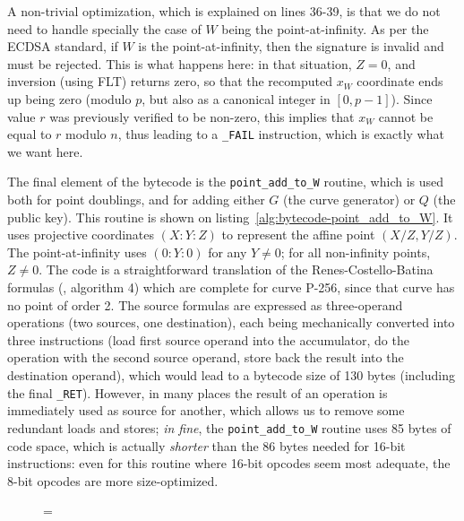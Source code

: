 \documentclass{llncs}
\newenvironment{forbidpagebreak}
    {\par\nobreak\vfil\penalty 0\vfilneg
     \vtop\bgroup}
    {\par\xdef\tpd{\the\prevdepth}\egroup
     \prevdepth=\tpd}
\begin{document}
A non-trivial optimization, which is explained on lines 36-39, is that
we do not need to handle specially the case of $W$ being the
point-at-infinity. As per the ECDSA standard, if $W$ is the
point-at-infinity, then the signature is invalid and must be rejected.
This is what happens here: in that situation, $Z = 0$, and inversion
(using FLT) returns zero, so that the recomputed $x_W$ coordinate ends
up being zero (modulo $p$, but also as a canonical integer in $[0,
p-1]$). Since value $r$ was previously verified to be non-zero, this
implies that $x_W$ cannot be equal to $r$ modulo $n$, thus leading to a
\verb+_FAIL+ instruction, which is exactly what we want here.

The final element of the bytecode is the \verb+point_add_to_W+ routine,
which is used both for point doublings, and for adding either $G$ (the
curve generator) or $Q$ (the public key). This routine is shown on
listing~\ref{alg:bytecode-point_add_to_W}. It uses projective
coordinates $(X{:}Y{:}Z)$ to represent the affine point $(X/Z, Y/Z)$.
The point-at-infinity uses $(0{:}Y{:}0)$ for any $Y\neq 0$; for all
non-infinity points, $Z\neq 0$. The code is a straightforward
translation of the Renes-Costello-Batina formulas (\cite{RenCosBat2016},
algorithm 4) which are complete for curve P-256, since that curve has no
point of order 2. The source formulas are expressed as three-operand
operations (two sources, one destination), each being mechanically
converted into three instructions (load first source operand into the
accumulator, do the operation with the second source operand, store back
the result into the destination operand), which would lead to a bytecode
size of 130 bytes (including the final \verb+_RET+). However, in many
places the result of an operation is immediately used as source for
another, which allows us to remove some redundant loads and stores;
\emph{in fine}, the \verb+point_add_to_W+ routine uses 85 bytes of code
space, which is actually \emph{shorter} than the 86 bytes needed for
16-bit instructions: even for this routine where 16-bit opcodes seem
most adequate, the 8-bit opcodes are more size-optimized.

\begin{figure}
\begin{forbidpagebreak}

\end{forbidpagebreak}
\end{figure}
\end{document}

